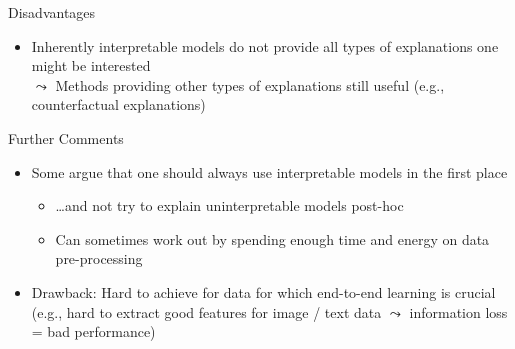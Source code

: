 \documentclass[11pt,compress,t,notes=noshow, aspectratio=169, xcolor=table]{beamer}
\begin{document}
\begin{frame}{Disadvantages}
\begin{itemize}
     \item<4-> Inherently interpretable models do not provide all types of explanations one might be interested\\
     $\leadsto$ Methods providing other types of explanations still useful (e.g., counterfactual explanations)
\end{itemize}
\end{frame}

\begin{frame}{Further Comments}

    \begin{itemize}
    \itemsep1em
        \item<1-> Some argue that one should always use interpretable models in the first place 
        \begin{itemize}
            \item \ldots and not try to explain uninterpretable models post-hoc
            \item Can sometimes work out by spending enough time and energy on data pre-processing %
        \end{itemize}
       \item<2->[$\leadsto$] Drawback: Hard to achieve for data for which end-to-end learning is crucial\\ 
        (e.g., hard to extract good features for image / text data $\leadsto$ information loss = bad performance)

\end{itemize}
\end{frame}
\end{document}
